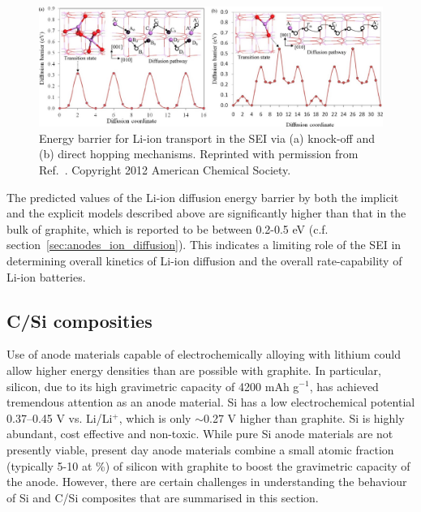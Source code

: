 \documentclass[../main.tex]{subfiles}
\begin{document}
\begin{figure}
    \centering
    \includegraphics[scale=0.5]{figures/sei.jpg}
    \caption{Energy barrier for Li-ion transport in the SEI via (a) knock-off and (b) direct hopping mechanisms. Reprinted with permission from Ref.~. Copyright 2012 American Chemical Society.}
    \label{fig:sei}
\end{figure}

The predicted values of the Li-ion diffusion energy barrier by both the implicit and the explicit models described above are significantly higher than that in the bulk of graphite, which is reported to be between 0.2-0.5 eV (c.f. section~\ref{sec:anodes_ion_diffusion}).\cite{thinius2014theoretical, Hakim, persson2010} This indicates a limiting role of the SEI in determining overall kinetics of Li-ion diffusion and the overall rate-capability of Li-ion batteries.

\subsection{C/Si composities}
\label{sec:carbon_silicon}
Use of anode materials capable of electrochemically alloying with lithium could allow higher energy densities than are possible with graphite. In particular, silicon, due to its high gravimetric capacity of 4200 mAh g$^{-1}$, has achieved tremendous attention as an anode material.\cite{larcher2007recent} Si has a low electrochemical potential 0.37--0.45 V vs. Li/Li$^+$, which is only $\sim$0.27 V higher than graphite.\cite{feng-Small-2018} Si is highly abundant, cost effective and non-toxic.\cite{nitta2014high, feng-Small-2018,Wagner-JPS-2019} While pure Si anode materials are not presently viable, present day anode materials combine a small atomic fraction (typically 5-10 at \%) of silicon with graphite to boost the gravimetric capacity of the anode.\cite{asenbauer_success_2020} However, there are certain challenges in understanding the behaviour of Si and C/Si composites that are summarised in this section.
\end{document}
